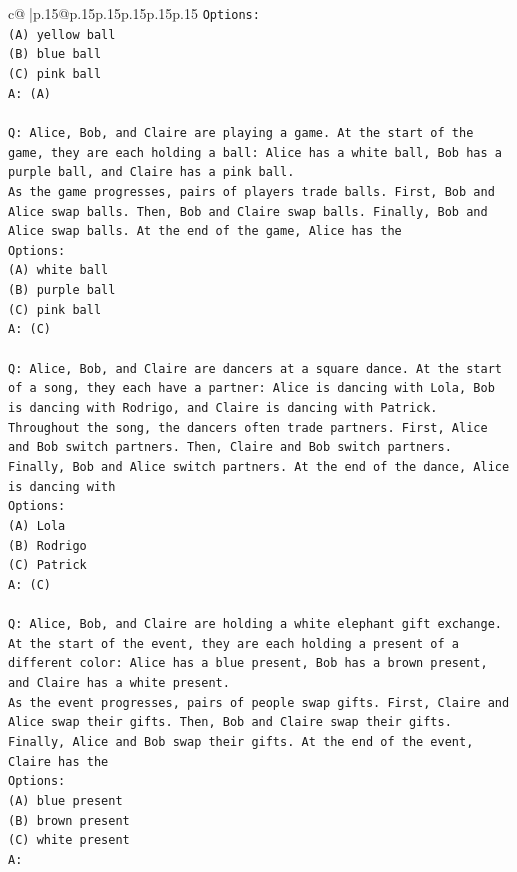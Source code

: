 \documentclass{article}
\begin{document}
{\begin{supertabular}{c@{$\;$}|p{.15\linewidth}@{}p{.15\linewidth}p{.15\linewidth}p{.15\linewidth}p{.15\linewidth}p{.15\linewidth}}
{{{\texttt{Options:} \\
\texttt{(A) yellow ball} \\
\texttt{(B) blue ball} \\
\texttt{(C) pink ball} \\
\texttt{A: (A)} \\
\\ 
\texttt{Q: Alice, Bob, and Claire are playing a game. At the start of the game, they are each holding a ball: Alice has a white ball, Bob has a purple ball, and Claire has a pink ball.} \\
\texttt{As the game progresses, pairs of players trade balls. First, Bob and Alice swap balls. Then, Bob and Claire swap balls. Finally, Bob and Alice swap balls. At the end of the game, Alice has the} \\
\texttt{Options:} \\
\texttt{(A) white ball} \\
\texttt{(B) purple ball} \\
\texttt{(C) pink ball} \\
\texttt{A: (C)} \\
\\ 
\texttt{Q: Alice, Bob, and Claire are dancers at a square dance. At the start of a song, they each have a partner: Alice is dancing with Lola, Bob is dancing with Rodrigo, and Claire is dancing with Patrick.} \\
\texttt{Throughout the song, the dancers often trade partners. First, Alice and Bob switch partners. Then, Claire and Bob switch partners. Finally, Bob and Alice switch partners. At the end of the dance, Alice is dancing with} \\
\texttt{Options:} \\
\texttt{(A) Lola} \\
\texttt{(B) Rodrigo} \\
\texttt{(C) Patrick} \\
\texttt{A: (C)} \\
\\ 
\texttt{Q: Alice, Bob, and Claire are holding a white elephant gift exchange. At the start of the event, they are each holding a present of a different color: Alice has a blue present, Bob has a brown present, and Claire has a white present.} \\
\texttt{As the event progresses, pairs of people swap gifts. First, Claire and Alice swap their gifts. Then, Bob and Claire swap their gifts. Finally, Alice and Bob swap their gifts. At the end of the event, Claire has the} \\
\texttt{Options:} \\
\texttt{(A) blue present} \\
\texttt{(B) brown present} \\
\texttt{(C) white present} \\
\texttt{A:} \\
            }
        }
    }
     \\ \\


\end{supertabular}}
\end{document}
